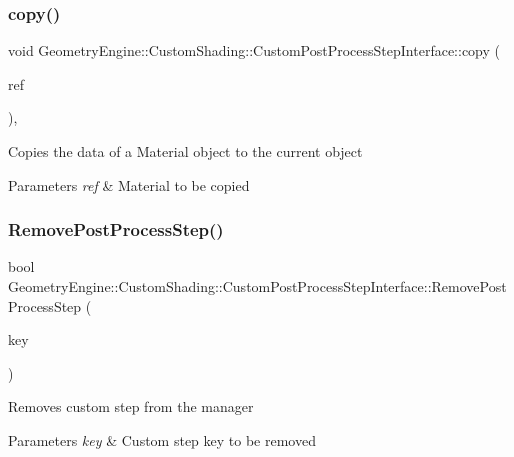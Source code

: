 \subsubsection{\texorpdfstring{copy()}{copy()}}
{\footnotesize\ttfamily void Geometry\+Engine\+::\+Custom\+Shading\+::\+Custom\+Post\+Process\+Step\+Interface\+::copy (\begin{DoxyParamCaption}\item[{const \mbox{\hyperlink{class_geometry_engine_1_1_custom_shading_1_1_custom_post_process_step_interface}{Custom\+Post\+Process\+Step\+Interface}} \&}]{ref }\end{DoxyParamCaption})\hspace{0.3cm}{\ttfamily [protected]}, {\ttfamily [virtual]}}

Copies the data of a Material object to the current object 
\begin{DoxyParams}{Parameters}
{\em ref} & Material to be copied \\
\hline
\end{DoxyParams}
\mbox{\label{class_geometry_engine_1_1_custom_shading_1_1_custom_post_process_step_interface_a539e97b28e9c5666f742ba5da4dc3b9c}} 
\subsubsection{\texorpdfstring{RemovePostProcessStep()}{RemovePostProcessStep()}}
{\footnotesize\ttfamily bool Geometry\+Engine\+::\+Custom\+Shading\+::\+Custom\+Post\+Process\+Step\+Interface\+::\+Remove\+Post\+Process\+Step (\begin{DoxyParamCaption}\item[{\mbox{\hyperlink{namespace_geometry_engine_1_1_custom_shading_a09e44ca81de5fe08c6d50271d680c4b1}{Custom\+Post\+Process\+Steps}}}]{key }\end{DoxyParamCaption})}

Removes custom step from the manager 
\begin{DoxyParams}{Parameters}
{\em key} & Custom step key to be removed \\
\hline
\end{DoxyParams}
\mbox{\label{class_geometry_engine_1_1_custom_shading_1_1_custom_post_process_step_interface_af9faf5b1fc1583807f45d744865da7d4}} 

